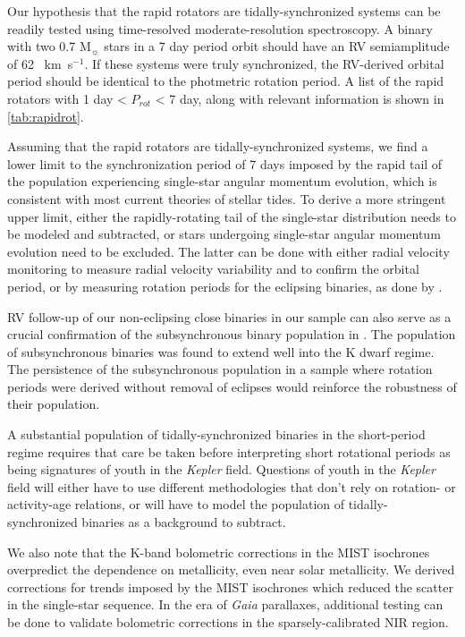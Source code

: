 \documentclass[manuscript]{aastex6}
\newcommand{\Kepler}{\mbox{\textit{Kepler}}}
\newcommand{\Gaia}{\mbox{\textit{Gaia}}}
\newcommand{\kms}{\textrm{~km~s}\ensuremath{^{-1}}}
\begin{document}
Our hypothesis that the rapid rotators are tidally-synchronized systems can be
readily tested using time-resolved moderate-resolution spectroscopy. A binary
with two 0.7 M\(_\sun\) stars in a 7 day period orbit should have an RV
semiamplitude of 62 \kms. If these systems were truly synchronized, the
RV-derived orbital period should be identical to the photmetric rotation
period. A list of the rapid rotators with 1 day < \(P_{rot}\) < 7 day, along
with relevant information is shown in \cref{tab:rapidrot}.

Assuming that the rapid rotators are tidally-synchronized systems, we find a
lower limit to the synchronization period of 7 days imposed by the rapid tail
of the population experiencing single-star angular momentum evolution, which is
consistent with most current theories of stellar tides. To derive a more
stringent upper limit, either the rapidly-rotating tail of the single-star
distribution needs to be modeled and subtracted, or stars undergoing 
single-star angular momentum evolution need to be excluded. The latter can be
done with either radial velocity monitoring to measure radial velocity
variability and to confirm the orbital period, or by measuring rotation periods
for the eclipsing binaries, as done by \citet{Lurie17}.

RV follow-up of our non-eclipsing close binaries in our sample can also serve
as a crucial confirmation of the subsynchronous binary population in
\citet{Lurie17}. The population of subsynchronous binaries was found to extend
well into the K dwarf regime. The persistence of the subsynchronous population
in a sample where rotation periods were derived without removal of eclipses 
would reinforce the robustness of their population.

A substantial population of tidally-synchronized binaries in the short-period 
regime requires that care be taken before interpreting short rotational 
periods as being signatures of youth in the \Kepler{} field. Questions of 
youth in the \Kepler{} field will either have to use different methodologies 
that don't rely on rotation- or activity-age relations, or will have to
model the population of tidally-synchronized binaries as a background to 
subtract. 

We also note that the K-band bolometric corrections in the MIST isochrones
overpredict the dependence on metallicity, even near solar metallicity. We
derived corrections for trends imposed by the MIST isochrones which reduced the
scatter in the single-star sequence. In the era of \Gaia{} parallaxes,
additional testing can be done to validate bolometric corrections in the
sparsely-calibrated NIR region.
\end{document}
